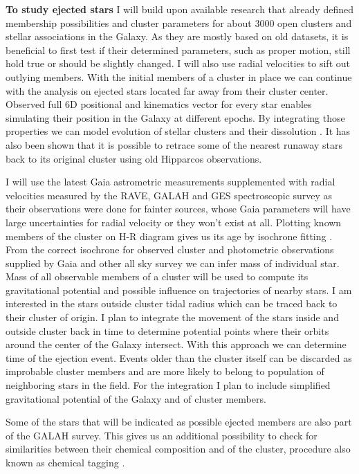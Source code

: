 \textbf{To study ejected stars} I will build upon available research that already defined membership possibilities and cluster parameters for about 3000 open clusters and stellar associations \cite{2013A&A...558A..53K} in the Galaxy. As they are mostly based on old datasets, it is beneficial to first test if their determined parameters, such as proper motion, still hold true or should be slightly changed. I will also use radial velocities to sift out outlying members. With the initial members of a cluster in place we can continue with the analysis on ejected stars located far away from their cluster center. Observed full 6D positional and kinematics vector for every star enables simulating their position in the Galaxy at different epochs. By integrating those properties we can model evolution of stellar clusters and their dissolution \cite{1998A&A...337..363P}. It has also been shown \cite{2000ApJ...544L.133H} that it is possible to retrace some of the nearest runaway stars back to its original cluster using old Hipparcos observations.

I will use the latest Gaia astrometric measurements supplemented with radial velocities measured by the RAVE, GALAH and GES spectroscopic survey as their observations were done for fainter sources, whose Gaia parameters will have large uncertainties for radial velocity or they won't exist at all. Plotting known members of the cluster on H-R diagram gives us its age by isochrone fitting \cite{2016ApJ...828...79J}. From the correct isochrone for observed cluster and photometric observations supplied by Gaia and other all sky survey we can infer mass of individual star. Mass of all observable members of a cluster will be used to compute its gravitational potential and possible influence on trajectories of nearby stars. I am interested in the stars outside cluster tidal radius which can be traced back to their cluster of origin. I plan to integrate the movement of the stars inside and outside cluster back in time to determine potential points where their orbits around the center of the Galaxy intersect. With this approach we can determine time of the ejection event. Events older than the cluster itself can be discarded as improbable cluster members and are more likely to belong to population of neighboring stars in the field. For the integration I plan to include simplified gravitational potential of the Galaxy \cite{2014MNRAS.437..351B} and of cluster members. %

Some of the stars that will be indicated as possible ejected members are also part of the GALAH survey. This gives us an additional possibility \cite{2018MNRAS.473.4612K} to check for similarities between their chemical composition and of the cluster, procedure also known as chemical tagging \cite{2002ARA&A..40..487F}.

